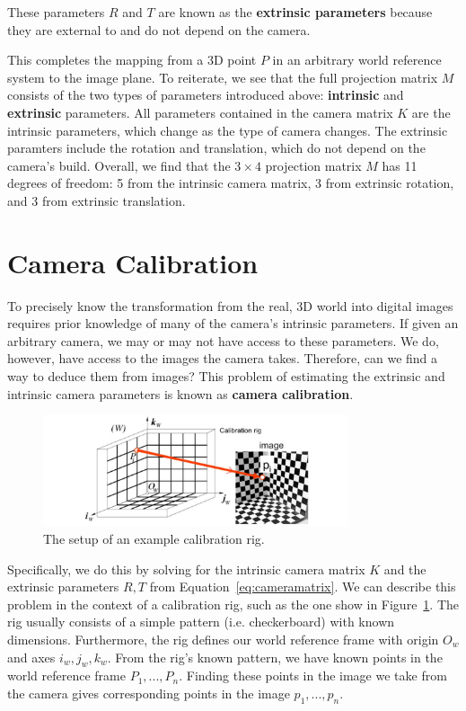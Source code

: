 \documentclass[a4paper, 12pt]{article}
\renewcommand\emph{\textbf}
\begin{document}
These parameters $R$ and $T$ are known as the \emph{extrinsic parameters} because they are external to and do not depend on the camera.

\vspace{12pt}

This completes the mapping from a 3D point $P$ in an arbitrary world reference system to the image plane. To reiterate, we see that the full projection matrix $M$ consists of the two types of parameters introduced above: \emph{intrinsic} and \emph{extrinsic} parameters. All parameters contained in the camera matrix $K$ are the intrinsic parameters, which change as the type of camera changes. The extrinsic paramters include the rotation and translation, which do not depend on the camera's build. Overall, we find that the $3\times4$ projection matrix $M$ has 11 degrees of freedom: 5 from the intrinsic camera matrix, 3 from extrinsic rotation, and 3 from extrinsic translation.

\section{Camera Calibration}
To precisely know the transformation from the real, 3D world into digital images requires prior knowledge of many of the camera's intrinsic parameters. If given an arbitrary camera, we may or may not have access to these parameters. We do, however, have access to the images the camera takes. Therefore, can we find a way to deduce them from images? This problem of estimating the extrinsic and intrinsic camera parameters is known as \emph{camera calibration}.

\begin{figure}[h!]
\centering
\includegraphics[width=0.8\textwidth]{figures/1-7.pdf}
\caption{The setup of an example calibration rig.}
\label{fig:calibration}
\end{figure}

Specifically, we do this by solving for the intrinsic camera matrix $K$ and the extrinsic parameters $R,T$ from Equation~\ref{eq:cameramatrix}. We can describe this problem in the context of a calibration rig, such as the one show in Figure~\ref{fig:calibration}. The rig usually consists of a simple pattern (i.e. checkerboard) with known dimensions. Furthermore, the rig defines our world reference frame with origin $O_w$ and axes $i_w, j_w, k_w$. From the rig's known pattern, we have known points in the world reference frame $P_1,...,P_n$. Finding these points in the image we take from the camera gives corresponding points in the image $p_1,...,p_n$. 
\end{document}
